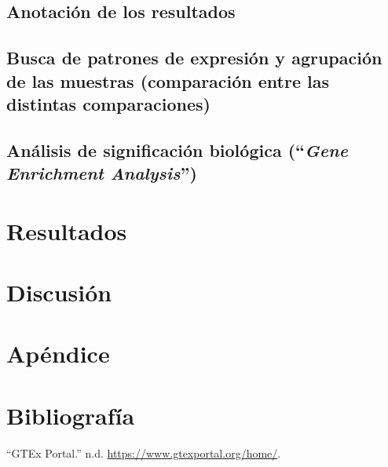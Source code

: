 \documentclass[
  english,
]{article}
\begin{document}
\hypertarget{anotaciuxf3n-de-los-resultados}{%
\subsection{Anotación de los
resultados}\label{anotaciuxf3n-de-los-resultados}}

\hypertarget{busca-de-patrones-de-expresiuxf3n-y-agrupaciuxf3n-de-las-muestras-comparaciuxf3n-entre-las-distintas-comparaciones}{%
\subsection{Busca de patrones de expresión y agrupación de las muestras
(comparación entre las distintas
comparaciones)}\label{busca-de-patrones-de-expresiuxf3n-y-agrupaciuxf3n-de-las-muestras-comparaciuxf3n-entre-las-distintas-comparaciones}}

\hypertarget{anuxe1lisis-de-significaciuxf3n-bioluxf3gica-gene-enrichment-analysis}{%
\subsection{\texorpdfstring{Análisis de significación biológica
(``\emph{Gene Enrichment
Analysis}'')}{Análisis de significación biológica (``Gene Enrichment Analysis'')}}\label{anuxe1lisis-de-significaciuxf3n-bioluxf3gica-gene-enrichment-analysis}}

\hypertarget{resultados}{%
\section{Resultados}\label{resultados}}

\hypertarget{discusiuxf3n}{%
\section{Discusión}\label{discusiuxf3n}}

\hypertarget{apuxe9ndice}{%
\section{Apéndice}\label{apuxe9ndice}}

\hypertarget{bibliografuxeda}{%
\section*{Bibliografía}\label{bibliografuxeda}}

\hypertarget{refs}{}
\leavevmode\hypertarget{ref-GTEx}{}%
``GTEx Portal.'' n.d. \url{https://www.gtexportal.org/home/}.
\end{document}
